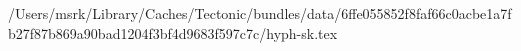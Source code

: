 /Users/msrk/Library/Caches/Tectonic/bundles/data/6ffe055852f8faf66c0acbe1a7fb27f87b869a90bad1204f3bf4d9683f597c7c/hyph-sk.tex